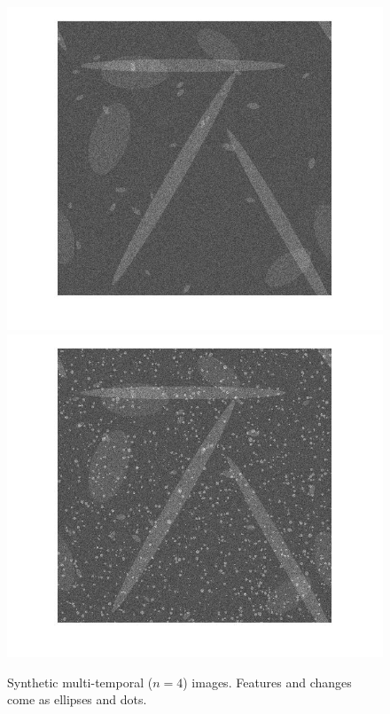 \documentclass[journal]{IEEEtran}
\begin{document}
\begin{figure}[htb!]
\includegraphics[scale=.17]{../../figs/ellipses_t3}
\includegraphics[scale=.17]{../../figs/ellipses_t4}
\caption{Synthetic multi-temporal ($n=4$) images. Features and changes come as ellipses and dots.}
\label{F:EllipsoidChanges}
\end{figure}
\end{document}
